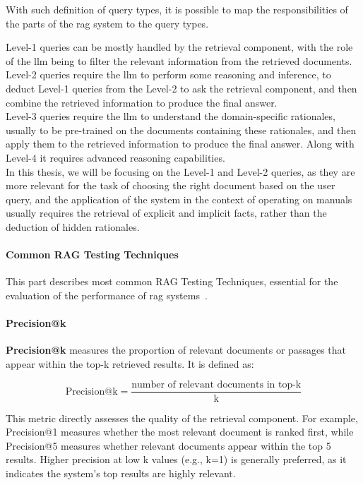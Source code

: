 With such definition of query types, it is possible to map the responsibilities
of the parts of the \gls{rag} system to the query types.

Level-1 queries can be mostly handled by the retrieval component, with the role
of the \gls{llm} being to filter the relevant information from the retrieved
documents.\\
Level-2 queries require the \gls{llm} to perform some reasoning and inference,
to deduct Level-1 queries from the Level-2 to ask the retrieval component, and
then combine the retrieved information to produce the final answer.\\
Level-3 queries require the \gls{llm} to understand the domain-specific
rationales, usually to be pre-trained on the documents containing these
rationales, and then apply them to the retrieved information to produce the
final answer. Along with Level-4 it requires advanced reasoning capabilities.\\

In this thesis, we will be focusing on the Level-1 and Level-2 queries, as they
are more relevant for the task of choosing the right document based on the user
query, and the application of the system in the context of operating on
manuals usually requires the retrieval of explicit and implicit facts, rather
than the deduction of hidden rationales.

\paragraph{Common RAG Testing Techniques}\label{sec:rag-eval}

This part describes most common RAG Testing Techniques, essential for the
evaluation of the performance of \gls{rag} systems~\cite{rag-evaluation,
langsmith2026rag}.

\paragraph{Precision@k}

\textbf{Precision@k} measures the proportion of relevant documents or passages
that appear within the top-k retrieved results. It is defined as:

\[
  \text{Precision@k} = \frac{\text{number of relevant documents in
  top-k}}{\text{k}}
\]

This metric directly assesses the quality of the retrieval component. For
example, Precision@1 measures whether the most relevant document is ranked
first, while Precision@5 measures whether relevant documents appear within the
top 5 results. Higher precision at low k values (e.g., k=1) is generally
preferred, as it indicates the system's top results are highly relevant.

